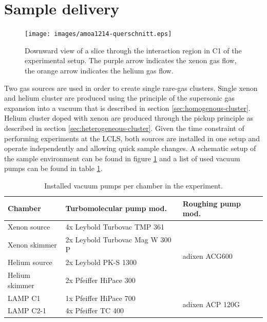 \section{Sample delivery}\label{sec:sample-delivery}
\begin{figure}
	\centering
		\texttt{[image: images/amoa1214-querschnitt.eps]}
	\caption[Sideview of double sample jet configuration.]{Downward view of a slice through the interaction region in C1 of the experimental setup. The purple arrow indicates the xenon gas flow, the orange arrow indicates the helium gas flow.}
	\label{fig:Overview-Jetalignment}
\end{figure}
Two gas sources are used in order to create single rare-gas clusters. Single xenon and helium cluster are produced using the principle of the supersonic gas expansion into a vacuum that is described in section \ref{sec:homogenous-cluster}. Helium cluster doped with xenon are produced through the pickup principle as described in section \ref{sec:heterogeneous-cluster}. Given the time constraint of performing experiments at the LCLS, both sources are installed in one setup and operate independently and allowing quick sample changes. A schematic setup of the sample environment can be found in figure \ref{fig:Overview-Jetalignment} and a list of used vacuum pumps can be found in table \ref{tab:vacuum-table}.\\
\begin{table}
	\centering
\begin{tabular}{ | l | l | l | }
\hline
	\textbf{Chamber} & \textbf{Turbomolecular pump mod.} & \textbf{Roughing pump mod.} \\ \hline
	Xenon source & 4x Leybold Turbovac TMP 361 & \multirow{4}{*}{adixen ACG600} \\ 
	Xenon skimmer & 2x Leybold Turbovac Mag W 300 P &  \\ 
	Helium source & 2x Leybold PK-S 1300 & \\ 
	Helium skimmer & 2x Pfeiffer HiPace 300 & \\ \hline
	LAMP C1 & 1x Pfeiffer HiPace 700 & \multirow{2}{*}{adixen ACP 120G} \\ 
	LAMP C2-1 & 4x Pfeiffer TC 400 & \\ \hline
\end{tabular}
\caption[Installed vacuum pumps in the experiment.]{Installed vacuum pumps per chamber in the experiment.}
\label{tab:vacuum-table}
\end{table}

